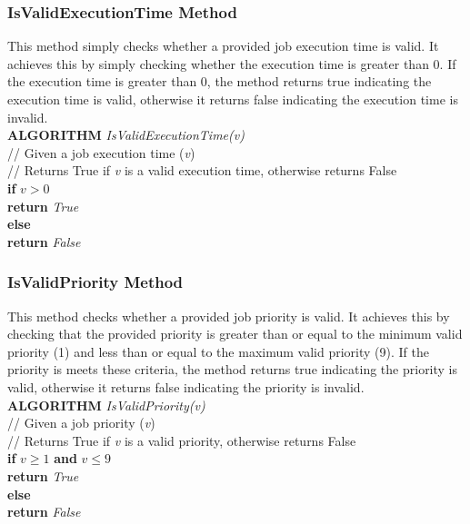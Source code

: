 \documentclass[12pt,a4paper]{article}
\begin{document}
			\subsubsection{IsValidExecutionTime Method}
				This method simply checks whether a provided job execution time is valid. It achieves 
				this by simply checking whether the execution time is greater than 0. If the execution 
				time is greater than 0, the method returns true indicating the execution time is valid,
				otherwise it returns false indicating the execution time is invalid.\\

				\textbf{ALGORITHM} \textit{IsValidExecutionTime(v)}\\
				\null\qquad\quad// Given a job execution time (\textit{v})\\
				\null\qquad\quad// Returns True if \textit{v} is a valid execution time, otherwise returns False\\
				\null\qquad\quad\textbf{if} \textit{$v > 0$}\\
				\null\qquad\qquad\textbf{return} \textit{True}\\
				\null\qquad\quad\textbf{else}\\
				\null\qquad\qquad\textbf{return} \textit{False}

			\newpage

			\subsubsection{IsValidPriority Method}
				This method checks whether a provided job priority is valid. It achieves this by 
				checking that the provided priority is greater than or equal to the minimum valid priority (1) and 
				less than or equal to the maximum valid priority (9). If the priority is meets these criteria, the 
				method returns true indicating the priority is valid, otherwise it returns false 
				indicating the priority is invalid.\\

				\textbf{ALGORITHM} \textit{IsValidPriority(v)}\\
				\null\qquad\quad// Given a job priority (\textit{v})\\
				\null\qquad\quad// Returns True if \textit{v} is a valid priority, otherwise returns False\\
				\null\qquad\quad\textbf{if} \textit{$v \geq 1$} \textbf{and} \textit{$v \leq 9$}\\
				\null\qquad\qquad\textbf{return} \textit{True}\\
				\null\qquad\quad\textbf{else}\\
				\null\qquad\qquad\textbf{return} \textit{False}
			
\end{document}

